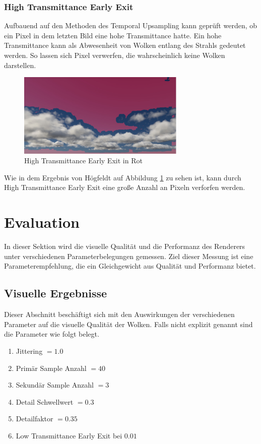 \subsubsection{High Transmittance Early Exit}
Aufbauend auf den Methoden des Temporal Upsampling kann geprüft werden, ob ein Pixel in dem letzten Bild eine hohe Transmittance hatte. Ein hohe Transmittance kann als Abwesenheit von Wolken entlang des Strahls gedeutet werden. So lassen sich Pixel verwerfen, die wahrscheinlich keine Wolken darstellen.

\begin{figure}[H]
    \centering
    \includegraphics[width=8cm]{figures/htee.png}
    \caption{High Transmittance Early Exit in Rot \cite{Högfeldt16}}
    \label{fig:htee}
\end{figure}

Wie in dem Ergebnis von Högfeldt \cite{Högfeldt16} auf Abbildung \ref{fig:htee} zu sehen ist, kann durch High Transmittance Early Exit eine große Anzahl an Pixeln verforfen werden.

\section{Evaluation}
\label{sec:evaluation}
In dieser Sektion wird die visuelle Qualität und die Performanz des Renderers unter verschiedenen Parameterbelegungen gemessen. Ziel dieser Messung ist eine Parameterempfehlung, die ein Gleichgewicht aus Qualität und Performanz bietet.

\subsection{Visuelle Ergebnisse}
Dieser Abschnitt beschäftigt sich mit den Auswirkungen der verschiedenen Parameter auf die visuelle Qualität der Wolken. Falls nicht explizit genannt sind die Parameter wie folgt belegt.\\

\begin{enumerate}
    \item Jittering $ = 1.0 $
    \item Primär Sample Anzahl $ = 40 $
    \item Sekundär Sample Anzahl $ = 3 $
    \item Detail Schwellwert $ = 0.3 $
    \item Detailfaktor $ = 0.35 $
    \item Low Transmittance Early Exit bei $ 0.01 $
\end{enumerate}

